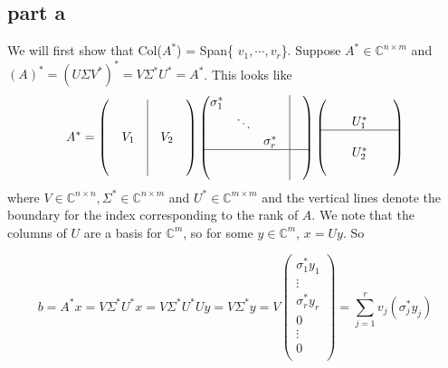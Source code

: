 \documentclass[a4paper,12pt]{article}
\begin{document}
\subsection{part a}
We will first show that Col($A^*$) = Span\{ $v_1,\cdots, v_r$\}. Suppose $A^* \in \mathbb{C}^{n\times m}$ and $(A)^* = (U\Sigma V^*)^* = V\Sigma^* U^*=A^*$. This looks like
\begin{equation}
A^* =  \begin{pmatrix}
&	&\vline&		&\\
&	&\vline&		&\\
&V_1&\vline &V_2 & \\
&	&\vline&		&\\
&	&\vline&		&\\
\end{pmatrix}
\begin{pmatrix}
\sigma_1^*&	&&	\vline	&\\
&\ddots	&&	\vline	&\\
&		&\sigma_r^*&\vline & \\ \hline
&	&&	\vline	&\\
&	&&	\vline	&\\
\end{pmatrix}
\begin{pmatrix}
&	&&		&\\
&	&U_1^*&		&\\ \hline
&	&		&			& \\ 
&	&U_2^* 	&		&\\
&	&&		&\\
\end{pmatrix}
\end{equation}
where $V\in \mathbb{C}^{n\times n}, \Sigma^* \in \mathbb{C}^{n\times m}$ and $U^* \in \mathbb{C}^{m\times m}$ and the vertical lines denote the boundary for the index corresponding to the rank of $A$. We note that the columns of $U$ are a basis for $\mathbb{C}^m$, so for some $y \in \mathbb{C}^m$, $x=Uy$. So

\begin{equation}
b=A^* x = V\Sigma^* U^* x= V\Sigma^* U^* U y= V\Sigma^* y = V\begin{pmatrix}
\sigma_1^* y_1 \\
\vdots \\
\sigma_r^* y_r \\
0 \\
\vdots \\
0 \\
\end{pmatrix} = \sum_{j=1}^r v_j (\sigma_j^* y_j)
\end{equation}
\end{document}

